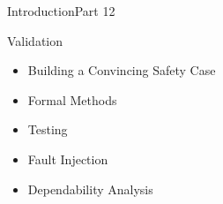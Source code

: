 \begin{frame}{Introduction}{Part 12}
    \begin{block}{Validation}
\begin{itemize}
\item
  Building a Convincing Safety Case
\item
  Formal Methods
\item
  Testing
\item
  Fault Injection
\item
  Dependability Analysis
\end{itemize}
\end{block}
\end{frame}

